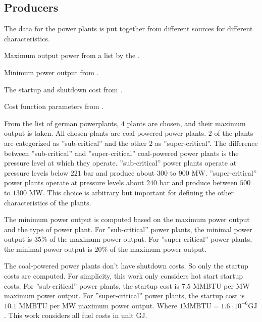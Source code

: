 \subsection{Producers}

The data for the power plants is put together from different sources for different characteristics.
\begin{enumerate*}[label=(\roman*)]
  \item Maximum output power from a list by the \citeauthor{Kraftwerkliste2020}. \cite{Kraftwerkliste2020}
  \item Minimum power output from \cite{Schroder2013}.
  \item The startup and shutdown cost from \cite{Kumar2012}.
  \item Cost function parameters from \cite{Alrashidi2009}.
\end{enumerate*}

From the list of german powerplants, $4$ plants are chosen, and their maximum output is taken.
All chosen plants are coal powered power plants.
\cite{Kraftwerkliste2020}
$2$ of the plants are categorized as ''sub-critical'' and the other $2$ as ''super-critical''.
The difference between ''sub-critical'' and ''super-critical'' coal-powered power plants is the pressure level at which they operate.
''sub-critical'' power plants operate at pressure levels below $221$ bar and produce about $300$ to $900$ MW.
''super-critical'' power plants operate at pressure levels about $240$ bar and produce between $500$ to $1300$ MW.
\cite{Kumar2012, Schroder2013}
This choice is arbitrary but important for defining the other characteristics of the plants.

The minimum power output is computed based on the maximum power output and the type of power plant.
For ''sub-critical'' power plants, the minimal power output is $35\%$ of the maximum power output.
For ''super-critical'' power plants, the minimal power output is $20\%$ of the maximum power output.
\cite{Schroder2013}

The coal-powered power plants don't have shutdown costs.
So only the startup costs are computed.
For simplicity, this work only considers hot start startup costs.
For ''sub-critical'' power plants, the startup cost is $7.5$ MMBTU per MW maximum power output.
For ''super-critical'' power plants, the startup cost is $10.1$ MMBTU per MW maximum power output.
\cite{Kumar2012}
Where $1 \text{MMBTU} = 1.6 \cdot 10^{-6} \text{GJ}$.
This work considers all fuel costs in unit GJ.


